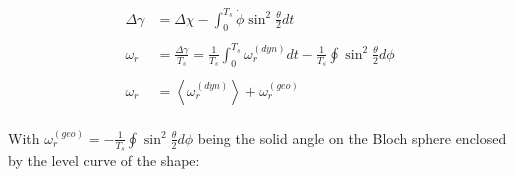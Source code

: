 \begin{align*}
\Delta \gamma &= \Delta \chi - \int_0^{T_s}\dot{\phi}\sin^2{\frac{\theta}{2}}dt\\
\\
\omega_r &= \frac{\Delta \gamma}{T_s} = \frac{1}{T_s}\int_0^{T_s}\omega_r^{(dyn)}dt -\frac{1}{T_s}\oint\sin^2{\frac{\theta}{2}}d\phi\\
\\
\omega_r &= \left\langle \omega_r^{(dyn)} \right\rangle + \omega_r^{(geo)}\\
\end{align*}

With $\omega_r^{(geo)}= -\frac{1}{T_s}\oint\sin^2{\frac{\theta}{2}}d\phi$ being the solid angle on the Bloch sphere enclosed by the level curve of the shape:




